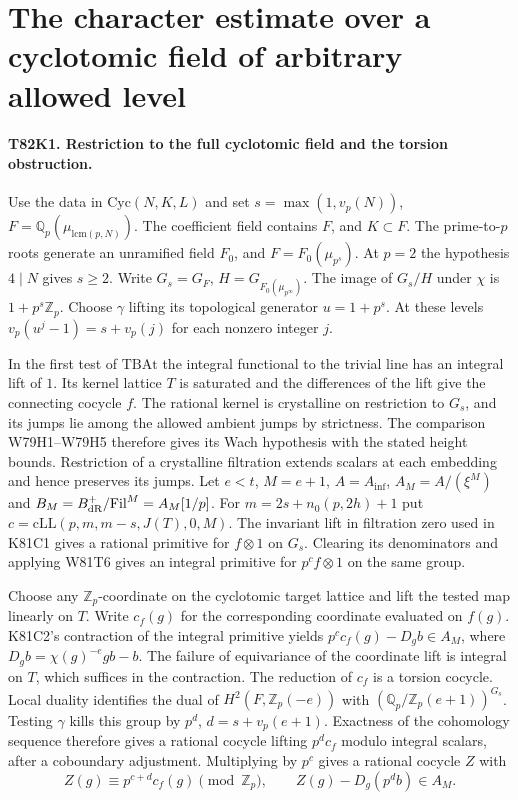 \section{The character estimate over a cyclotomic field of arbitrary allowed level}

\paragraph{T82K1. Restriction to the full cyclotomic field and the torsion obstruction.}
Use the data in $\mathrm{Cyc}(N,K,L)$ and set
$s=\max(1,v_p(N))$, $F=\mathbb Q_p(\mu_{\mathrm{lcm}(p,N)})$.
The coefficient field contains $F$, and $K\subset F$. The
prime-to-$p$ roots generate an unramified field $F_0$, and
$F=F_0(\mu_{p^s})$. At $p=2$ the hypothesis $4\mid N$ gives
$s\ge2$. Write $G_s=G_F$, $H=G_{F_0(\mu_{p^\infty})}$.
The image of $G_s/H$ under $\chi$ is $1+p^s\mathbb Z_p$.
Choose $\gamma$ lifting its topological generator $u=1+p^s$.
At these levels $v_p(u^j-1)=s+v_p(j)$ for each nonzero integer $j$.

In the first test of $\mathrm{TBAt}$ the integral functional to the
trivial line has an integral lift of $1$. Its kernel lattice $T$ is
saturated and the differences of the lift give the connecting cocycle
$f$. The rational kernel is crystalline on restriction to $G_s$,
and its jumps lie among the allowed ambient jumps by strictness. The
comparison W79H1--W79H5 therefore gives its Wach hypothesis with
the stated height bounds. Restriction of a crystalline filtration
extends scalars at each embedding and hence preserves its jumps.
Let $e<t$, $M=e+1$, $A=A_{\inf}$, $A_M=A/(\xi^M)$ and
$B_M=B_{\rm dR}^+/\mathrm{Fil}^{M}=A_M[1/p]$.
For $m=2s+n_0(p,2h)+1$ put $c=\mathrm{cLL}(p,m,m-s,J(T),0,M)$.
The invariant lift in filtration zero used in K81C1 gives a
rational primitive for $f\otimes1$ on $G_s$. Clearing its
denominators and applying W81T6 gives an integral primitive for
$p^cf\otimes1$ on the same group.

Choose any $\mathbb Z_p$-coordinate on the cyclotomic target
lattice and lift the tested map linearly on $T$. Write $c_f(g)$ for
the corresponding coordinate evaluated on $f(g)$. K81C2's
contraction of the integral primitive yields
$p^c c_f(g)-D_g b\in A_M$, where $D_g b=\chi(g)^{-e}g b-b$.
The failure of equivariance of the coordinate lift is integral
on $T$, which suffices in the contraction. The reduction of $c_f$
is a torsion cocycle. Local duality identifies the dual of
$H^2(F,\mathbb Z_p(-e))$ with $(\mathbb Q_p/\mathbb Z_p(e+1))^{G_s}$.
Testing $\gamma$ kills this group by $p^d$, $d=s+v_p(e+1)$.
Exactness of the cohomology sequence therefore gives a rational
cocycle lifting $p^d c_f$ modulo integral scalars, after a
coboundary adjustment. Multiplying by $p^c$ gives a rational
cocycle $Z$ with
\[
 Z(g)\equiv p^{c+d}c_f(g)\pmod{\mathbb Z_p},
 \qquad Z(g)-D_g(p^db)\in A_M .
\]

